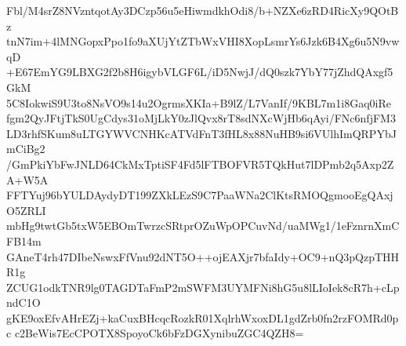 Fbl/M4srZ8NVzntqotAy3DCzp56u5eHiwmdkhOdi8/b+NZXe6zRD4RicXy9QOtBz
tnN7im+4lMNGopxPpo1fo9aXUjYtZTbWxVHI8XopLsmrYs6Jzk6B4Xg6u5N9vwqD
+E67EmYG9LBXG2f2b8H6igybVLGF6L/iD5NwjJ/dQ0szk7YbY77jZhdQAxgf5GkM
5C8IokwiS9U3to8NsVO9s14u2OgrmsXKIa+B9lZ/L7VanIf/9KBL7m1i8Gaq0iRe
fgm2QyJFtjTkS0UgCdys31oMjLkY0zJlQvx8rT8sdNXcWjHb6qAyi/FNc6nfjFM3
LD3rhfSKum8uLTGYWVCNHKcATVdFnT3fHL8x88NuHB9si6VUlhImQRPYbJmCiBg2
/GmPkiYbFwJNLD64CkMxTptiSF4Fd5lFTBOFVR5TQkHut7lDPmb2q5Axp2ZA+W5A
FFTYuj96bYULDAydyDT199ZXkLEzS9C7PaaWNa2ClKtsRMOQgmooEgQAxjO5ZRLI
mbHg9twtGb5txW5EBOmTwrzcSRtprOZuWpOPCuvNd/uaMWg1/1eFznrnXmCFB14m
GAneT4rh47DIbeNswxFfVnu92dNT5O++ojEAXjr7bfaIdy+OC9+nQ3pQzpTHHR1g
ZCUG1odkTNR9lg0TAGDTaFmP2mSWFM3UYMFNi8hG5u8lLIoIek8cR7h+cLpndC1O
gKE9oxEfvAHrEZj+kaCuxBHcqcRozkR01XqlrhWxoxDL1gdZrb0fn2rzFOMRd0pc
c2BeWis7EcCPOTX8SpoyoCk6bFzDGXynibuZGC4QZH8=
